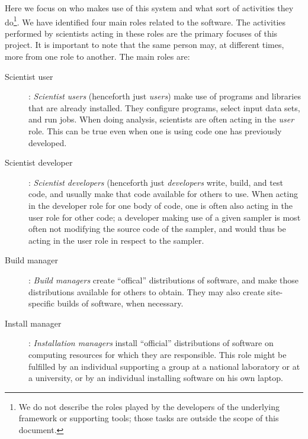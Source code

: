 \documentclass[draftmode,draftwater]{memarticle}
\newcommand{\cosmosis}{\name{CosmoSIS}\xspace}
\begin{document}
Here we focus on who makes use of this system and what sort of
activities they do\footnote{We do not describe the roles played by the
  developers of the underlying framework or supporting tools; those
  tasks are outside the scope of this document.}. We have identified
four main roles related to the \cosmosis software. The activities
performed by scientists acting in these roles are the primary focuses of
this project. It is important to note that the same person may, at
different times, more from one role to another. The main roles are:
\begin{description}

\item[Scientist user]: \emph{Scientist users} (henceforth just
  \emph{users}) make use of programs and libraries that are already
  installed. They configure programs, select input data sets, and run
  jobs. When doing analysis, scientists are often acting in the
  \emph{user} role. This can be true even when one is using code one has
  previously developed.

\item[Scientist developer]: \emph{Scientist developers} (henceforth just
  \emph{developers} write, build, and test code, and usually make that
  code available for others to use. When acting in the developer role
  for one body of code, one is often also acting in the user role for
  other code; \eg a developer making use of a given sampler is most
  often not modifying the source code of the sampler, and would thus be
  acting in the user role in respect to the sampler.

\item[Build manager]: \emph{Build managers} create ``offical''
  distributions of software, and make those distributions available for
  others to obtain. They may also create site-specific builds of
  software, when necessary.

\item[Install manager]: \emph{Installation managers} install
  ``official'' distributions of software on computing resources for
  which they are responsible. This role might be fulfilled by an
  individual supporting a group at a national laboratory or at a
  university, or by an individual installing software on his own laptop.
\end{description}
\end{document}
